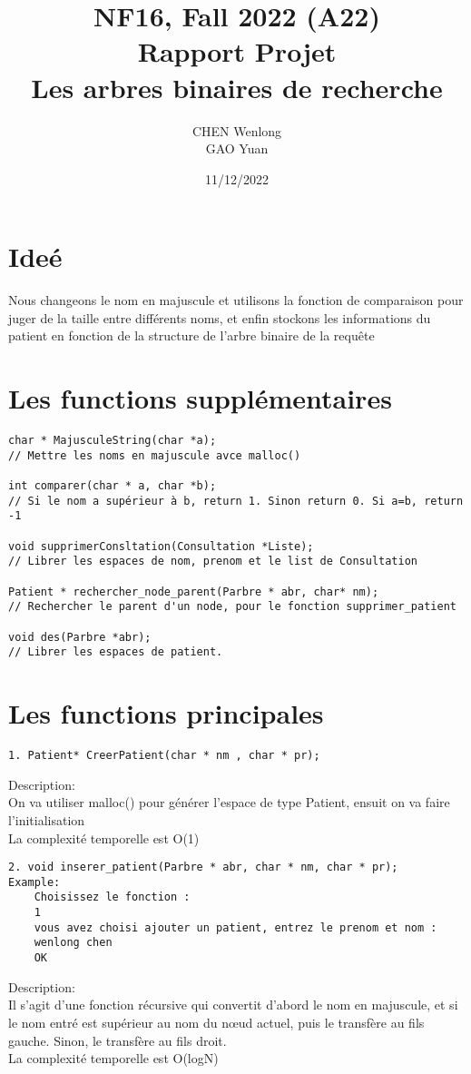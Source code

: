 \documentclass[11pt]{article}
\title{NF16, Fall 2022 (A22) \\
Rapport Projet\\
Les arbres binaires de recherche
\\
}
\author{CHEN Wenlong\\
GAO Yuan}
\date{11/12/2022}
\begin{document}
\maketitle

\section*{Ideé}
Nous changeons le nom en majuscule et utilisons la fonction de comparaison pour juger de la taille entre différents noms, et enfin stockons les informations du patient en fonction de la structure de l'arbre binaire de la requête

\section*{Les functions supplémentaires}
\begin{verbatim}
char * MajusculeString(char *a);
// Mettre les noms en majuscule avce malloc()

int comparer(char * a, char *b);
// Si le nom a supérieur à b, return 1. Sinon return 0. Si a=b, return -1

void supprimerConsltation(Consultation *Liste);
// Librer les espaces de nom, prenom et le list de Consultation

Patient * rechercher_node_parent(Parbre * abr, char* nm);
// Rechercher le parent d'un node, pour le fonction supprimer_patient

void des(Parbre *abr);
// Librer les espaces de patient.
\end{verbatim}

\section*{Les functions principales}
\begin{verbatim}
1. Patient* CreerPatient(char * nm , char * pr);
\end{verbatim}
Description:\\
On va utiliser malloc() pour générer l'espace de type Patient, ensuit on va faire l'initialisation\\
La complexité temporelle est O(1)

\begin{verbatim}
2. void inserer_patient(Parbre * abr, char * nm, char * pr);
Example:
    Choisissez le fonction :
    1
    vous avez choisi ajouter un patient, entrez le prenom et nom :
    wenlong chen
    OK
\end{verbatim}
Description:\\
Il s'agit d'une fonction récursive qui convertit d'abord le nom en majuscule, et si le nom entré est supérieur au nom du nœud actuel, puis le transfère au fils gauche. Sinon, le transfère au fils droit.\\
La complexité temporelle est O(logN)
\end{document}
